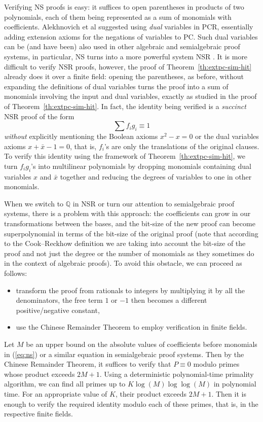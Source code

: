 \documentclass[11pt]{article}
\newcommand{\scterm}[1]{{\textrm{\sc #1}}}
\newcommand{\pc}{\scterm{PC}}
\newcommand{\pcr}{\scterm{PCR}}
\newcommand{\ns}{\scterm{NS}}
\newcommand{\nsr}{\scterm{NSR}}
\numberwithin{equation}{section}
\begin{document}
Verifying {\ns} proofs is easy: it suffices to open parentheses in products
of two polynomials, each of them being represented as a sum of monomials with coefficients.
Alekhnovich et al \cite{ABSRW02} suggested using \emph{dual} variables in {\pcr},
essentially adding extension axioms for the negations of variables to {\pc}.
Such dual variables can be (and have been) also used in other algebraic
and semialgebraic proof systems, in particular, {\ns} turns
into a more powerful system {\nsr} \cite{dRLNS21}.
It is more difficult to verify {\nsr} proofs, however,
the proof of Theorem~\ref{th:extpc-sim-hit} already does it over a finite field:
opening the parentheses, as before, without expanding the definitions of
dual variables turns the proof into a sum of monomials involving the input and dual
variables, exactly as studied in the proof of Theorem~\ref{th:extpc-sim-hit}.
In fact, the identity being verified is a \emph{succinct} {\nsr} proof
of the form \begin{equation}\label{eq:ns}\sum f_ig_i \equiv 1\end{equation}
\emph{without} explicitly mentioning the Boolean axioms $x^2-x=0$ or the dual
variables axioms $x+\bar{x}-1=0$,
that is, $f_i$'s are only the translations of the original clauses.
To verify this identity using the framework of Theorem~\ref{th:extpc-sim-hit},
we turn $f_ig_i$'s into multilinear polynomials by dropping monomials
containing dual variables $x$ and $\bar{x}$ together
and reducing the degrees of variables to one in other monomials.

When we switch to $\mathbb{Q}$ in {\nsr} or turn our attention to
semialgebraic proof systems, there is a problem with this approach:
the coefficients can grow in our transformations between the bases,
and the bit-size of the new proof can become superpolynomial
in terms of the bit-size of the original proof
(note that according to the Cook--Reckhow definition
we are taking into account the bit-size of the proof and
not just the degree or the number of monomials as they sometimes do
in the context of algebraic proofs).
To avoid this obstacle, we can proceed as follows:
\begin{itemize}
\item transform the proof from rationals to integers 
by multiplying it by all the denominators,
the free term $1$ or $-1$ then becomes a different positive/negative constant, 
\item use the Chinese Remainder Theorem to employ verification in finite fields. 
\end{itemize}
Let $M$ be an upper bound on the absolute values of coefficients before monomials in (\ref{eq:ns})
or a similar equation in semialgebraic proof systems.
Then by the Chinese Remainder Theorem, it suffices to verify that $P \equiv 0$ modulo primes whose product exceeds $2M+1$. Using a deterministic polynomial-time primality algorithm, we can find all primes up to $K \log(M) \log \log(M)$ in polynomial time. For an appropriate value of $K$, their product exceeds $2M+1$. Then it is enough to verify the required identity modulo each of these primes, that is, in the respective finite fields.
\end{document}
